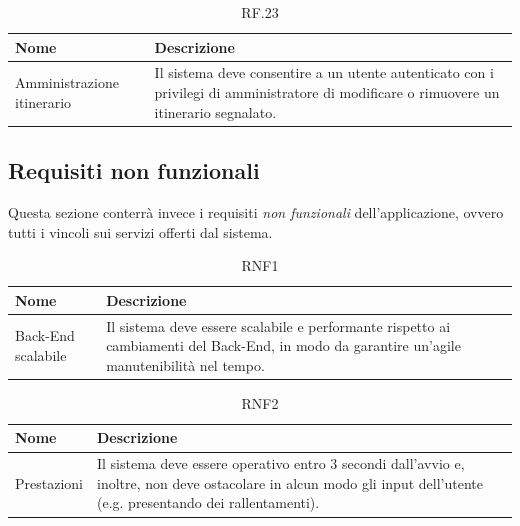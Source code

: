 \documentclass{natourDoc}
\begin{document}
\begin{table}[H]
	\centering
	\begin{tabular}{ |p{5cm}|p{10.3cm}| }
		\hline
		\rowcolor{PineGreen!70}
		\textbf{Nome}              & \textbf{Descrizione}                                                                                 \\
		\hline
		Amministrazione itinerario & Il sistema deve consentire a un utente autenticato con i privilegi di amministratore di modificare o
		rimuovere un itinerario segnalato.                                                                                                \\
		\hline
	\end{tabular}
	\caption{RF.23}
\end{table}

\newpage
\subsection{Requisiti non funzionali}
Questa sezione conterrà invece i requisiti \textit{non funzionali} dell'applicazione, ovvero tutti i vincoli sui servizi offerti dal sistema.

\begin{table}[H]
	\centering
	\begin{tabular}{ |p{5cm}|p{10.3cm}| }
		\hline
		\rowcolor{PineGreen!70}
		\textbf{Nome}      & \textbf{Descrizione}                                                                 \\
		\hline
		Back-End scalabile & Il sistema deve essere scalabile e performante rispetto ai cambiamenti del Back-End,
		in modo da garantire un'agile manutenibilità nel tempo.                                                   \\
		\hline
	\end{tabular}
	\caption{RNF1}
\end{table}

\begin{table}[H]
	\centering
	\begin{tabular}{ |p{5cm}|p{10.3cm}| }
		\hline
		\rowcolor{PineGreen!70}
		\textbf{Nome} & \textbf{Descrizione}                                                                           \\
		\hline
		Prestazioni   & Il sistema deve essere operativo entro 3 secondi dall'avvio e, inoltre, non deve ostacolare in
		alcun modo gli input dell'utente (e.g. presentando dei rallentamenti).                                         \\
		\hline
	\end{tabular}
	\caption{RNF2}
\end{table}
\end{document}
